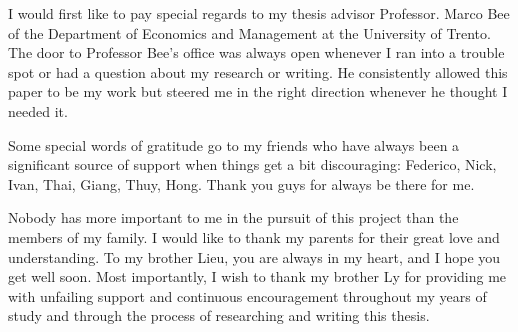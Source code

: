 I would first like to pay special regards to my thesis advisor Professor. Marco
Bee of the Department of Economics and Management at the University of Trento.
The door to Professor Bee's office was always open whenever I ran into a
trouble spot or had a question about my research or writing. He consistently
allowed this paper to be my work but steered me in the right direction
whenever he thought I needed it.

Some special words of gratitude go to my friends who have always been a
significant source of support when things get a bit discouraging: Federico,
Nick, Ivan, Thai, Giang, Thuy, Hong. Thank you guys for always be there for me.

Nobody has more important to me in the pursuit of this project than the members
of my family. I would like to thank my parents for their great love and
understanding. To my brother Lieu, you are always in my heart, and  I hope you
get well soon. Most importantly, I wish to thank my brother Ly for providing me with
unfailing support and continuous encouragement throughout my years of study and
through the process of researching and writing this thesis.
